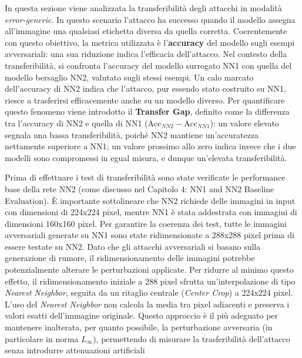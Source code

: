 \documentclass[a4paper, 12pt]{article}
\begin{document}
In questa sezione viene analizzata la transferibilità degli attacchi in modalità 
\textit{error-generic}. In questo scenario l'attacco ha successo quando il modello assegna 
all'immagine una qualsiasi etichetta diversa da quella corretta. Coerentemente con questo obiettivo, la metrica utilizzata è l'\textbf{accuracy} 
del modello sugli esempi avversariali: una sua riduzione indica l'efficacia 
dell'attacco. Nel contesto della transferibilità, si confronta l'accuracy del 
modello surrogato NN1 con quella del modello bersaglio NN2, valutato sugli stessi esempi. Un calo marcato 
dell'accuracy di NN2 indica che l'attacco, pur essendo stato costruito su NN1, 
riesce a trasferirsi efficacemente anche su un modello diverso. Per quantificare questo fenomeno viene introdotto il \textbf{Transfer Gap}, 
definito come la differenza tra l'accuracy di NN2 e quella di NN1 
($\text{Acc}_{NN2} - \text{Acc}_{NN1}$): un valore elevato segnala una bassa 
transferibilità, poiché NN2 mantiene un'accuratezza nettamente superiore a NN1; 
un valore prossimo allo zero indica invece che i due modelli sono compromessi in 
egual misura, e dunque un'elevata transferibilità.

Prima di effettuare i test di transferibilità sono state verificate le performance base della rete NN2 (come discusso nel Capitolo 4: NN1 and NN2 Baseline Evaluation). 
È importante sottolineare che NN2 richiede delle immagini in input con dimensioni di 224x224 pixel, mentre NN1 è stata addestrata con immagini di dimensioni 160x160 pixel. 
Per garantire la coerenza dei test, tutte le immagini avversariali generate su NN1 sono state ridimensionate a 288x288 pixel prima di essere testate su NN2. 
Dato che gli attacchi avversariali si basano sulla generazione di rumore, il ridimensionamento delle immagini potrebbe potenzialmente alterare le perturbazioni applicate. 
Per ridurre al minimo questo effetto, il ridimensionamento iniziale a 288 pixel sfrutta un'interpolazione di tipo \textit{Nearest Neighbor}, 
seguita da un ritaglio centrale (\textit{Center Crop}) a 224x224 pixel. L'uso del \textit{Nearest Neighbor} non calcola la media tra pixel adiacenti e preserva i valori esatti dell'immagine originale. 
Questo approccio è il più adeguato per mantenere inalterata, per quanto possibile, la perturbazione avversaria (in particolare in norma $L_\infty$), permettendo di misurare la trasferibilità dell'attacco 
senza introdurre attenuazioni artificiali

\vspace{10pt}
\end{document}
